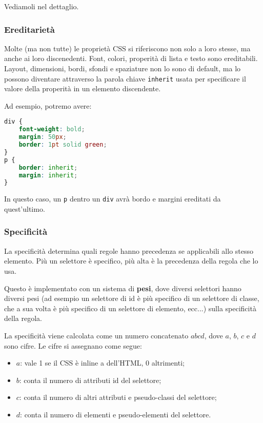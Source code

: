 \documentclass[a4paper,11pt]{article}
\begin{document}
Vediamoli nel dettaglio.

\subsubsection{Ereditarietà}
Molte (ma non tutte) le proprietà CSS si riferiscono non solo a loro stesse, ma anche ai loro discenedenti.
Font, colori, properità di lista e testo sono ereditabili.
Layout, dimensioni, bordi, sfondi e spaziature non lo sono di default, ma lo possono diventare attraverso la parola chiave \lstinline|inherit| usata per specificare il valore della properità in un elemento discendente.

Ad esempio, potremo avere:
\begin{lstlisting}[language=css, style=codestyle]	
div {
	font-weight: bold;
	margin: 50px;
	border: 1pt solid green;
}
p {
	border: inherit;
	margin: inherit;
}
\end{lstlisting}

In questo caso, un \lstinline|p| dentro un \lstinline|div| avrà bordo e margini ereditati da quest'ultimo.

\subsubsection{Specificità}
La specificità determina quali regole hanno precedenza se applicabili allo stesso elemento.
Più un selettore è specifico, più alta è la precedenza della regola che lo usa.

Questo è implementato con un sistema di \textbf{pesi}, dove diversi selettori hanno diversi pesi (ad esempio un selettore di id è più specifico di un selettore di classe, che a sua volta è più specifico di un selettore di elemento, ecc...) sulla specificità della regola.

La specificità viene calcolata come un numero concatenato $abcd$, dove $a$, $b$, $c$ e $d$ sono cifre.
Le cifre si assegnano come segue:

\begin{itemize}
	\item $a$: vale 1 se il CSS è inline a dell'HTML, 0 altrimenti;
	\item $b$: conta il numero di attributi id del selettore;
	\item $c$: conta il numero di altri attributi e pseudo-classi del selettore;
	\item $d$: conta il numero di elementi e pseudo-elementi del selettore.
\end{itemize}
\end{document}
